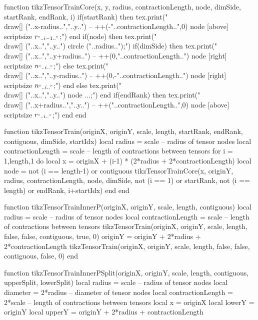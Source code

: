 \begin{luacode*}
function tikzTensorTrainCore(x, y, radius, contractionLength, node, dimSide, startRank, endRank, i)
	 if(startRank) then
			tex.print("\\draw[] ("..x-radius..","..y..") -- ++(-"..contractionLength..",0) node [above] {\\scriptsize $r_{".. i-1 .."}$};")
	 end
	 if(node) then
			tex.print("\\draw[] ("..x..","..y..") circle ("..radius..");")
			if(dimSide) then
				 tex.print("\\draw[] ("..x..","..y+radius..") -- ++(0,"..contractionLength..") node [right] {\\scriptsize $n_{"..i.."}$};")
			else
				 tex.print("\\draw[] ("..x..","..y-radius..") -- ++(0,-"..contractionLength..") node [right] {\\scriptsize $n_{"..i.."}$};")
			end
	 else
			tex.print("\\draw[] ("..x..","..y..") node {...};")
	 end
	 if(endRank) then
			tex.print("\\draw[] ("..x+radius..","..y..") -- ++("..contractionLength..",0) node [above] {\\scriptsize $r_{"..i.."}$};")
	 end
end

function tikzTensorTrain(originX, originY, scale, length, startRank, endRank, contiguous, dimSide, startIdx)
	 local radius = scale              -- radius of tensor nodes
	 local contractionLength = scale   -- length of contractions between tensors
	 for i = 1,length,1 do
			local x = originX + (i-1) * (2*radius + 2*contractionLength)
			local node = not (i == length-1) or contiguous
			tikzTensorTrainCore(x, originY, radius, contractionLength, node, dimSide, not (i == 1) or startRank, not (i == length) or endRank, i+startIdx)
	 end
end

function tikzTensorTrainInnerP(originX, originY, scale, length, contiguous)
	 local radius = scale              -- radius of tensor nodes
	 local contractionLength = scale -- length of contractions between tensors
	 tikzTensorTrain(originX, originY, scale, length, false, false, contiguous, true, 0)
	 originY = originY + 2*radius + 2*contractionLength
	 tikzTensorTrain(originX, originY, scale, length, false, false, contiguous, false, 0)
end

function tikzTensorTrainInnerPSplit(originX, originY, scale, length, contiguous, upperSplit, lowerSplit)
	 local radius = scale              -- radius of tensor nodes
	 local diameter = 2*radius         -- diameter of tensor nodes
	 local contractionLength = 2*scale -- length of contractions between tensors
	 local x = originX
	 local lowerY = originY
	 local upperY = originY + 2*radius + contractionLength


\end{luacode*}
